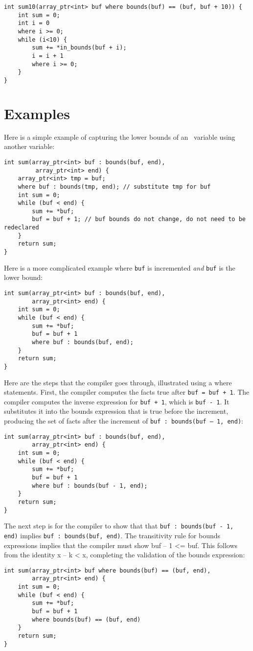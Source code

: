 \begin{verbatim}
int sum10(array_ptr<int> buf where bounds(buf) == (buf, buf + 10)) {
    int sum = 0;
    int i = 0
    where i >= 0;
    while (i<10) {
        sum += *in_bounds(buf + i);
        i = i + 1
        where i >= 0;
    }
}
\end{verbatim}

\section{Examples}

Here is a simple example of capturing the lower bounds of an
\arrayptr\ variable using another variable:

\begin{verbatim}
int sum(array_ptr<int> buf : bounds(buf, end), 
         array_ptr<int> end) {
    array_ptr<int> tmp = buf;
    where buf : bounds(tmp, end); // substitute tmp for buf
    int sum = 0;
    while (buf < end) {
        sum += *buf;   
        buf = buf + 1; // buf bounds do not change, do not need to be redeclared
    }
    return sum;
}
\end{verbatim}

Here is a more complicated example where \texttt{buf} is incremented
\emph{and} \texttt{buf} is the lower bound:

\begin{verbatim}
int sum(array_ptr<int> buf : bounds(buf, end), 
        array_ptr<int> end) {
    int sum = 0;
    while (buf < end) {
        sum += *buf;   
        buf = buf + 1
        where buf : bounds(buf, end);
    }
    return sum;
}
\end{verbatim}

Here are the steps that the compiler goes through, illustrated using a
where statements. First, the compiler computes the facts true after
\texttt{buf = buf + 1}. The compiler computes the inverse expression for
\texttt{buf + 1}, which is \texttt{buf - 1}. It substitutes it into the
bounds expression that is true before the increment, producing the set
of facts after the increment of \texttt{buf : bounds(buf -- 1, end)}:

\begin{verbatim}
int sum(array_ptr<int> buf : bounds(buf, end), 
        array_ptr<int> end) {
    int sum = 0;
    while (buf < end) {
        sum += *buf;   
        buf = buf + 1
        where buf : bounds(buf - 1, end); 
    }
    return sum;
}
\end{verbatim}

The next step is for the compiler to show that that \texttt{buf :
bounds(buf - 1, end)} implies \texttt{buf : bounds(buf, end)}. The
transitivity rule for bounds expressions implies that the compiler must
show buf -- 1 \textless{}= buf. This follows from the identity x -- k
\textless{} x, completing the validation of the bounds expression:

\begin{verbatim}
int sum(array_ptr<int> buf where bounds(buf) == (buf, end), 
        array_ptr<int> end) {
    int sum = 0;
    while (buf < end) {
        sum += *buf;   
        buf = buf + 1
        where bounds(buf) == (buf, end) 
    }
    return sum;
}
\end{verbatim}